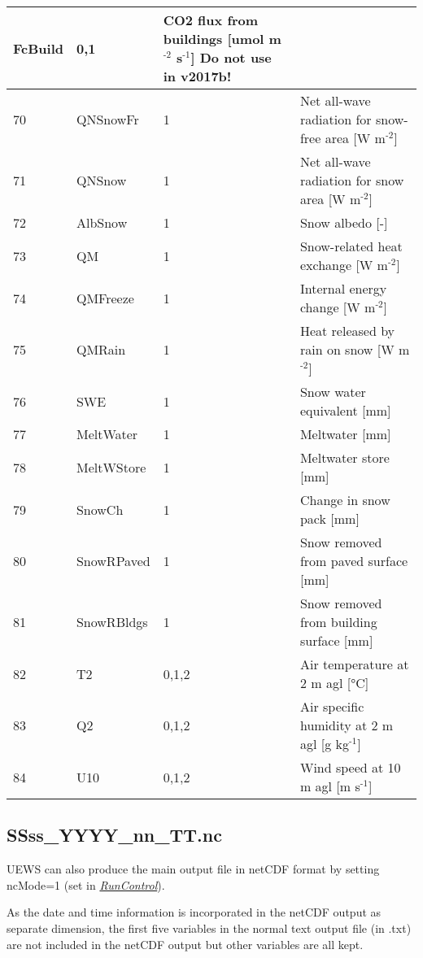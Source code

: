\documentclass[letterpaper,10pt,english]{sphinxmanual}
\begin{document}
\begin{savenotes}
\begin{longtable}{|l|l|l|l|}
FcBuild
&
0,1
&
CO2 flux from buildings {[}umol m$^{\text{-2}}$ s$^{\text{-1}}${]} Do not use in v2017b!
\\
\hline
70
&
QNSnowFr
&
1
&
Net all-wave radiation for snow-free area {[}W m$^{\text{-2}}${]}
\\
\hline
71
&
QNSnow
&
1
&
Net all-wave radiation for snow area {[}W m$^{\text{-2}}${]}
\\
\hline
72
&
AlbSnow
&
1
&
Snow albedo {[}-{]}
\\
\hline
73
&
QM
&
1
&
Snow-related heat exchange {[}W m$^{\text{-2}}${]}
\\
\hline
74
&
QMFreeze
&
1
&
Internal energy change {[}W m$^{\text{-2}}${]}
\\
\hline
75
&
QMRain
&
1
&
Heat released by rain on snow {[}W m$^{\text{-2}}${]}
\\
\hline
76
&
SWE
&
1
&
Snow water equivalent {[}mm{]}
\\
\hline
77
&
MeltWater
&
1
&
Meltwater {[}mm{]}
\\
\hline
78
&
MeltWStore
&
1
&
Meltwater store {[}mm{]}
\\
\hline
79
&
SnowCh
&
1
&
Change in snow pack {[}mm{]}
\\
\hline
80
&
SnowRPaved
&
1
&
Snow removed from paved surface {[}mm{]}
\\
\hline
81
&
SnowRBldgs
&
1
&
Snow removed from building surface {[}mm{]}
\\
\hline
82
&
T2
&
0,1,2
&
Air temperature at 2 m agl {[}°C{]}
\\
\hline
83
&
Q2
&
0,1,2
&
Air specific humidity at 2 m agl {[}g kg$^{\text{-1}}${]}
\\
\hline
84
&
U10
&
0,1,2
&
Wind speed at 10 m agl {[}m s$^{\text{-1}}${]}
\\
\hline
\end{longtable}\sphinxatlongtableend\end{savenotes}


\subsection{SSss\_YYYY\_nn\_TT.nc}
\label{\detokenize{output_files/output_files:ssss-yyyy-nn-tt-nc}}
UEWS can also produce the main output file in netCDF format by setting ncMode=1 (set in {\hyperref[\detokenize{output_files/output_files:RunControl}]{\emph{RunControl}}}).

As the date and time information is incorporated in the netCDF output as
separate dimension, the first five variables in the normal text output
file (in .txt) are not included in the netCDF output but other variables
are all kept.
\end{document}
